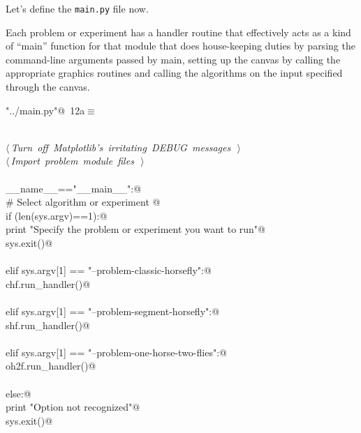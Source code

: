 \documentclass[11.5pt]{report}
\begin{document}
\newchunk Let's define the \verb|main.py| file now. 

Each problem or experiment has a handler routine 
that effectively acts as a kind of ``main'' function for that module that 
does house-keeping duties by parsing the command-line arguments passed by main, 
setting up the canvas by calling the appropriate graphics routines and calling 
the algorithms on the input specified through the canvas. 

\begin{flushleft} \small
\begin{minipage}{\linewidth}\label{scrap1}\raggedright\small
{} \verb@"../main.py"@\nobreak\ {\footnotesize {12a}}$\equiv$
\vspace{-1ex}
\begin{list}{}{} \item
\mbox{}\verb@@\\
\mbox{}\verb@@\hbox{$\langle\,${\itshape Turn off Matplotlib's irritating DEBUG messages}\nobreak\ {\footnotesize {}}$\,\rangle$}\verb@@\\
\mbox{}\verb@@\hbox{$\langle\,${\itshape Import problem module files}\nobreak\ {\footnotesize {}}$\,\rangle$}\verb@@\\
\mbox{}\verb@@\\
\mbox{}\verb@if __name__=="__main__":@\\
\mbox{}\verb@     # Select algorithm or experiment @\\
\mbox{}\verb@     if (len(sys.argv)==1):@\\
\mbox{}\verb@          print "Specify the problem or experiment you want to run"@\\
\mbox{}\verb@          sys.exit()@\\
\mbox{}\verb@@\\
\mbox{}\verb@     elif sys.argv[1] == "--problem-classic-horsefly":@\\
\mbox{}\verb@          chf.run_handler()@\\
\mbox{}\verb@@\\
\mbox{}\verb@     elif sys.argv[1] == "--problem-segment-horsefly":@\\
\mbox{}\verb@          shf.run_handler()@\\
\mbox{}\verb@@\\
\mbox{}\verb@     elif sys.argv[1] == "--problem-one-horse-two-flies":@\\
\mbox{}\verb@          oh2f.run_handler()@\\
\mbox{}\verb@@\\
\mbox{}\verb@     else:@\\
\mbox{}\verb@          print "Option not recognized"@\\
\mbox{}\verb@          sys.exit()@\\
\mbox{}\verb@@{\NWsep}
\end{list}
\vspace{-1.5ex}
\footnotesize
\begin{list}{}{\setlength{\itemsep}{-\parsep}\setlength{\itemindent}{-\leftmargin}}


\end{list}
\end{minipage}
\end{flushleft}
\end{document}

